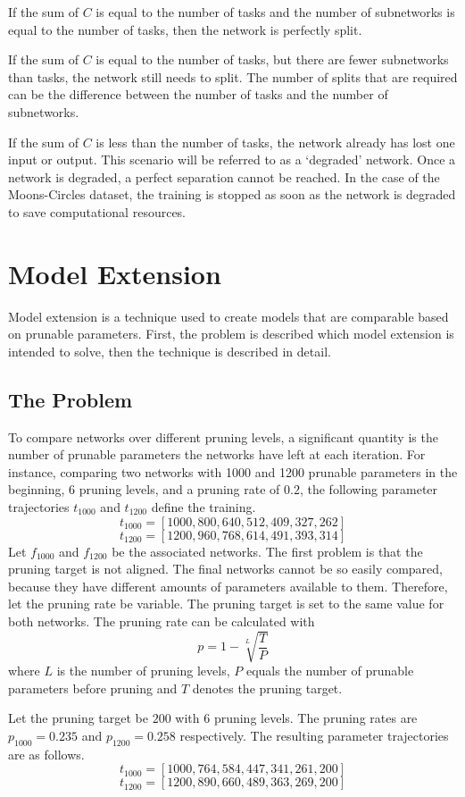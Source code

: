 If the sum of $C$ is equal to the number of tasks and the number of subnetworks is equal to the number of tasks, then the network is perfectly split.

If the sum of $C$ is equal to the number of tasks, but there are fewer subnetworks than tasks, the network still needs to split.
The number of splits that are required can be the difference between the number of tasks and the number of subnetworks.

If the sum of $C$ is less than the number of tasks, the network already has lost one input or output.
This scenario will be referred to as a `degraded' network.
Once a network is degraded, a perfect separation cannot be reached.
In the case of the Moons-Circles dataset, the training is stopped as soon as the network is degraded to save computational resources.

\section{Model Extension}
Model extension is a technique used to create models that are comparable based on prunable parameters. 
First, the problem is described which model extension is intended to solve, then the technique is described in detail.
\subsection{The Problem}
To compare networks over different pruning levels, a significant quantity is the number of prunable parameters the networks have left at each iteration.
For instance, comparing two networks with 1000 and 1200 prunable parameters in the beginning, 6 pruning levels, and a pruning rate of $0.2$, the following parameter trajectories $t_{1000}$ and $t_{1200}$ define the training.
\[
t_{1000} = [1000, 800, 640, 512, 409, 327, 262]
\]
\[
t_{1200} = [1200, 960, 768, 614, 491, 393, 314]
\]
Let $f_{1000}$ and $f_{1200}$ be the associated networks.
The first problem is that the pruning target is not aligned.
The final networks cannot be so easily compared, because they have different amounts of parameters available to them.
Therefore, let the pruning rate be variable. The pruning target is set to the same value for both networks.
The pruning rate can be calculated with 
\[
p = 1 - \sqrt[L]{\frac{T}{P}}
\]
where $L$ is the number of pruning levels, $P$ equals the number of prunable parameters before pruning and $T$ denotes the pruning target.

Let the pruning target be $200$ with 6 pruning levels.
The pruning rates are $p_{1000} = 0.235$ and $p_{1200} = 0.258$ respectively.
The resulting parameter trajectories are as follows.
\[
t_{1000} = [1000, 764, 584, 447, 341, 261, 200]
\]
\[
t_{1200} = [1200, 890, 660, 489, 363, 269, 200]
\]

